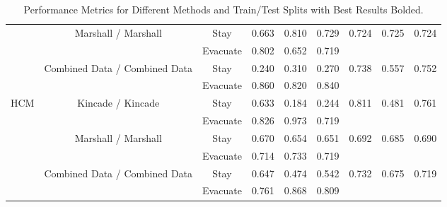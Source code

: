 \begin{table*}[t]
{\begin{tabular}{c|c|c|ccc|ccc}
\cmidrule{2-9}
& \multirow{2}{*}{Marshall / Marshall} 
  & Stay     & 0.663 & 0.810 & 0.729 & \multirow{2}{*}{0.724} & \multirow{2}{*}{0.725} & \multirow{2}{*}{0.724} \\
&           & Evacuate & 0.802 & 0.652 & 0.719 &                     &                     &                     \\ 
\cmidrule{2-9}
& \multirow{2}{*}{Combined Data / Combined Data} 
  & Stay     & 0.240 & 0.310 & 0.270 & \multirow{2}{*}{0.738} & \multirow{2}{*}{0.557} & \multirow{2}{*}{0.752} \\
&           & Evacuate & 0.860 & 0.820 & 0.840 &                     &                     &                     \\ 
\midrule
\multirow{6}{*}{HCM} 
& \multirow{2}{*}{Kincade / Kincade} 
  & Stay     & 0.633 & 0.184 & 0.244 & \multirow{2}{*}{0.811} & \multirow{2}{*}{0.481} & \multirow{2}{*}{0.761} \\
&           & Evacuate & 0.826 & 0.973 & 0.719 &                     &                     &                     \\ 
\cmidrule{2-9}
& \multirow{2}{*}{Marshall / Marshall} 
  & Stay     & 0.670 & 0.654 & 0.651 & \multirow{2}{*}{0.692} & \multirow{2}{*}{0.685} & \multirow{2}{*}{0.690} \\
&           & Evacuate & 0.714 & 0.733 & 0.719 &                     &                     &                     \\ 
\cmidrule{2-9}
& \multirow{2}{*}{Combined Data / Combined Data} 
  & Stay     & 0.647 & 0.474 & 0.542 & \multirow{2}{*}{0.732} & \multirow{2}{*}{0.675} & \multirow{2}{*}{0.719} \\
&           & Evacuate & 0.761 & 0.868 & 0.809 &                     &                     &                     \\ 


\bottomrule
\end{tabular}}
\caption{Performance Metrics for Different Methods and Train/Test Splits with Best Results Bolded.}
\label{tab:more_results}
\end{table*}
